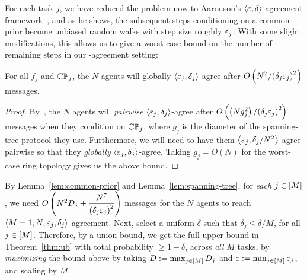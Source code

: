 For each task $j$, we have reduced the problem now to Aaronson's $\left \langle \varepsilon, \delta \right \rangle $-agreement framework~\citep{aaronson2005complexity}, and as he shows, the subsequent steps conditioning on a common prior become unbiased random walks with step size roughly $\varepsilon_j$.
With some slight modifications, this allows us to give a worst-case bound on the number of remaining steps in our \agree-agreement setting:
\begin{lemma}\label{lem:spanning-tree}
For all $f_j$ and $\mathbb{C}\mathbb{P}_j$, the $N$ agents will globally $\left \langle \varepsilon_j, \delta_j \right \rangle $-agree after $O\left({N^7}/{\left(\delta_j\varepsilon_j\right)^2}\right)$ messages.
\end{lemma}
\begin{proof}
By~\citep[Theorem 10]{aaronson2005complexity}, the $N$ agents will \emph{pairwise} $\left \langle \varepsilon_j, \delta_j \right \rangle $-agree after $O\left(\left(Ng_j^2\right)/{\left(\delta_j\varepsilon_j\right)^2}\right)$ messages when they condition on $\mathbb{C}\mathbb{P}_j$, where $g_j$ is the diameter of the spanning-tree protocol they use.
Furthermore, we will need to have them $\left \langle \varepsilon_j, \delta_j/N^2 \right \rangle $-agree pairwise so that they \emph{globally} $\left \langle \varepsilon_j, \delta_j \right \rangle $-agree.
Taking $g_j = O(N)$ for the worst-case ring topology gives us the above bound.
\end{proof}
By Lemma~\ref{lem:common-prior} and Lemma~\ref{lem:spanning-tree}, for \emph{each} $j \in [M]$, we need $O\left(N^2 D_j + \dfrac{N^7}{\left(\delta_j\varepsilon_j\right)^2}\right)$ messages for the $N$ agents to reach $\left \langle M=1, N, \varepsilon_j, \delta_j \right \rangle $-agreement.
Next, select a uniform $\delta$ such that $\delta_j \le \delta/M$, for all $j \in [M]$.
Therefore, by a union bound, we get the full upper bound in Theorem~\ref{thm:ub} with total probability $\ge 1- \delta$, across \emph{all} $M$ tasks, by \emph{maximizing} the bound above by taking $D := \max_{j \in [M]} D_j$ and $\varepsilon := \min_{j \in [M]}\varepsilon_j$, and scaling by $M$.

